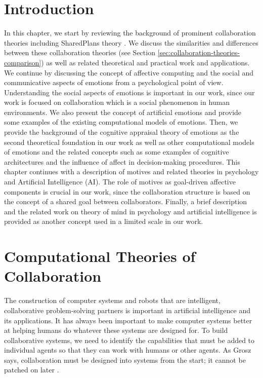 \documentclass[12pt]{report}
\begin{document}
\vspace*{-5mm}
\section{Introduction}
\vspace*{-3mm}
In this chapter, we start by reviewing the background of prominent collaboration
theories including SharedPlans theory
\cite{grosz:collaboration,grosz:plans-discourse}. We discuss the similarities
and differences between these collaboration theories (see Section
\ref{sec:collaboration-theories-comparison}) as well as related theoretical and
practical work and applications. We continue by discussing the concept of
affective computing and the social and communicative aspects of emotions from a
psychological point of view. Understanding the social aspects of emotions is
important in our work, since our work is focused on collaboration which is a
social phenomenon in human environments. We also present the concept of
artificial emotions and provide some examples of the existing computational
models of emotions. Then, we provide the background of the cognitive appraisal
theory of emotions as the second theoretical foundation in our work as well as
other computational models of emotions and the related concepts such as some
examples of cognitive architectures and the influence of affect in
decision-making procedures. This chapter continues with a description of motives
and related theories in psychology and Artificial Intelligence (AI). The role of
motives as goal-driven affective components is crucial in our work, since the
collaboration structure is based on the concept of a shared goal between
collaborators. Finally, a brief description and the related work on theory of
mind in psychology and artificial intelligence is provided as another concept
used in a limited scale in our work.

\section{Computational Theories of Collaboration}
The construction of computer systems and robots that are intelligent,
collaborative problem-solving partners is important in artificial intelligence
and its applications. It has always been important to make computer systems
better at helping humans do whatever these systems are designed for. To build
collaborative systems, we need to identify the capabilities that must be added
to individual agents so that they can work with humans or other agents. As Grosz
says, collaboration must be designed into systems from the start; it cannot be
patched on later \cite{grosz:collaborative-systems}.
\end{document}
